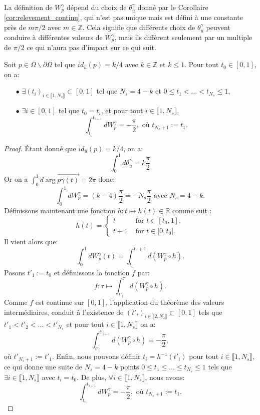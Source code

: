 \begin{remark}
\label{rmk:W_p_gamma}
La définition de $W_p^\gamma$ dépend du choix de $\theta_{\bar{u}}^\gamma$ donné par le Corollaire \ref{cor:relevement_continu}, qui n'est pas unique mais est défini à une constante près de $m\pi/2$ avec $m\in\mathbb{Z}$. Cela signifie que différents choix de $\theta_{\bar{u}}^\gamma$ peuvent conduire à différentes valeurs de $W_p^\gamma$, mais ils diffèrent seulement par un multiple de $\pi/2$ ce qui n'aura pas d'impact sur ce qui suit.
\end{remark}

\begin{lemma}
\label{lem:decoup_voisinnage}
Soit $p\in\Omega\backslash\partial\Omega$ tel que $id_{\bar{u}}(p)=k/4$ avec $k\in\mathbb{Z}$ et $k\leq 1$. Pour tout $t_0\in[0, 1]$, on a:\\

\begin{itemize}
    \item[$\bullet$] $\exists (t_i)_{i\in\llbracket1, N_s\rrbracket}\subset[0, 1]$ tel que $N_s=4-k$ et $0\leq t_1<\dots< t_{N_s}\leq 1$,\\
    \item[$\bullet$] $\exists i\in [0, 1]$ tel que $t_0=t_i$, et pour tout $i\in\llbracket 1, N_s\rrbracket$,
$$\int_{t_i}^{t_{i+1}}dW_p^\gamma=-\frac{\pi}{2},\mbox{ où }t_{N_s+1}:=t_1.$$
\end{itemize}
\end{lemma}

\begin{proof}
Étant donné que $id_{\bar{u}}(p)=k/4$, on a:
$$\int_0^1 d\theta^\gamma_{\bar{u}}=k\frac{\pi}{2}$$
Or on a $\int_0^1 d\arg{\overrightarrow{p\gamma(t)}}=2\pi$ donc:
$$\int_0^1 dW_p^\gamma=(k-4)\frac{\pi}{2}=-N_s\frac{\pi}{2} \mbox{ avec } N_s=4-k.$$
Définissons maintenant une fonction $h: t \mapsto h(t) \in \mathbb{R}$ comme suit :
$$
h(t) =
    \begin{cases}
        t&\mbox{ for }t\in[t_0, 1], \\
        t+1&\mbox{ for }t\in[0,t_0[.
    \end{cases}
$$
Il vient alors que:
$$\int_0^1 dW_p^\gamma(t)=\int_{t_0}^{t_0+1} d(W_p^\gamma \circ h).$$
Posons $t'_1 := t_0$ et définissons la fonction $f$ par:
$$f: \tau \mapsto \int_{t'_1}^\tau d(W_p^\gamma \circ h).$$
Comme $f$ est continue sur $[0,1]$, l'application du théorème des valeurs intermédiaires, conduit à l'existence de $(t'_i)_{i\in\llbracket 2,N_s\rrbracket}\subset[0, 1]$ tels que $t'_1<t'_2<\dots<t'_{N_s}$ et pour tout $i\in\llbracket1, N_s\rrbracket$ on a:
$$\int_{t'_i}^{t'_{i+1}}d(W_p^\gamma\circ h)=-\frac{\pi}{2},$$
où $t'_{N_s+1}:=t'_1$. Enfin, nous pouvons définir $t_i=h^{-1}(t'_i)$ pour tout $i\in\llbracket 1,N_s\rrbracket$, ce qui donne une suite de $N_s=4-k$ points $0\leq t_1\leq\dots\leq t_{N_s}\leq 1$ tels que $\exists i\in\llbracket 1,N_s\rrbracket$ avec $t_i=t_0$. De plus, $\forall i\in\llbracket 1,N_s\rrbracket$, nous avons:
$$\int_{t_i}^{t_{i+1}}dW_p^\gamma=-\frac{\pi}{2},\mbox{ où }t_{N_s+1}:=t_1.$$
\end{proof}

